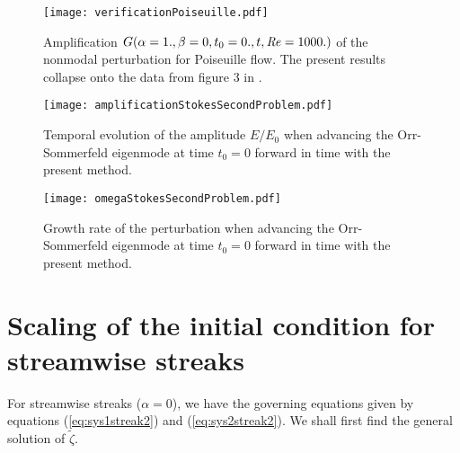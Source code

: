 \documentclass{jfm}
\newcommand\Rey{\mbox{\textit{Re}}}  %
\begin{document}
\begin{appendix}
\begin{figure}
  \centering
  \texttt{[image: verificationPoiseuille.pdf]}
  \caption{Amplification $ G(\alpha=1.,\beta=0,t_0 = 0.,t,\Rey = 1000.) $
    of the nonmodal perturbation for Poiseuille flow. 
    The present results collapse onto
    the data from figure 3 in \cite{Schmid2007}.}
  \label{fig:verification2}
\end{figure}

\begin{figure}
  \centering
  \texttt{[image: amplificationStokesSecondProblem.pdf]}
  \caption{Temporal evolution of the amplitude $ E/E_0 $ when advancing
    the Orr-Sommerfeld eigenmode at time $ t_0 = 0 $ forward in time
    with the present method. }
  \label{fig:stokesAmplitude}
\end{figure}

\begin{figure}
  \centering
  \texttt{[image: omegaStokesSecondProblem.pdf]}
  \caption{Growth rate of the perturbation when advancing
    the Orr-Sommerfeld eigenmode at time $ t_0 = 0 $ forward in time
    with the present method. }
  \label{fig:stokesOmega}
\end{figure}

\section{Scaling of the initial condition for streamwise streaks} \label{sec:initialCondition}

For streamwise streaks ($ \alpha = 0 $), we have the governing equations
given by equations (\ref{eq:sys1streak2}) and (\ref{eq:sys2streak2}).
We shall first find the general solution of $ \tilde{\zeta} $. 


\end{appendix}
\end{document}
